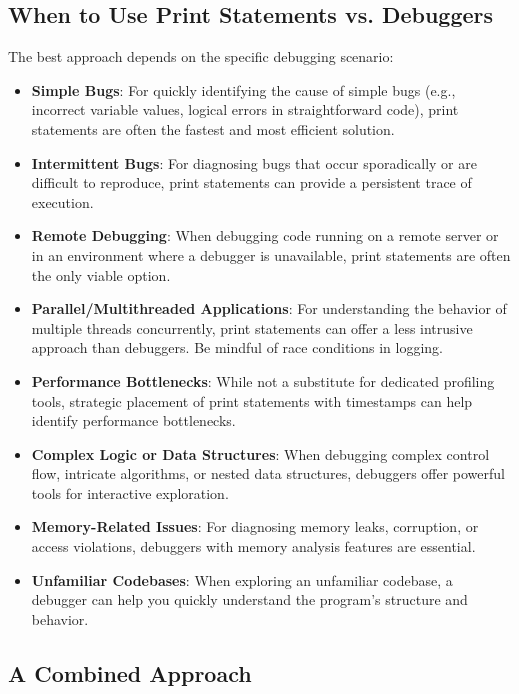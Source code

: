 \documentclass{article}
\begin{document}
\subsection*{When to Use Print Statements vs. Debuggers}

The best approach depends on the specific debugging scenario:

\begin{itemize}
    \item \textbf{Simple Bugs}: For quickly identifying the cause of simple bugs (e.g., incorrect variable values, logical errors in straightforward code), print statements are often the fastest and most efficient solution.
    \item \textbf{Intermittent Bugs}: For diagnosing bugs that occur sporadically or are difficult to reproduce, print statements can provide a persistent trace of execution.
    \item \textbf{Remote Debugging}: When debugging code running on a remote server or in an environment where a debugger is unavailable, print statements are often the only viable option.
    \item \textbf{Parallel/Multithreaded Applications}: For understanding the behavior of multiple threads concurrently, print statements can offer a less intrusive approach than debuggers.  Be mindful of race conditions in logging.
    \item \textbf{Performance Bottlenecks}: While not a substitute for dedicated profiling tools, strategic placement of print statements with timestamps can help identify performance bottlenecks.
    \item \textbf{Complex Logic or Data Structures}: When debugging complex control flow, intricate algorithms, or nested data structures, debuggers offer powerful tools for interactive exploration.
    \item \textbf{Memory-Related Issues}: For diagnosing memory leaks, corruption, or access violations, debuggers with memory analysis features are essential.
    \item \textbf{Unfamiliar Codebases}: When exploring an unfamiliar codebase, a debugger can help you quickly understand the program's structure and behavior.
\end{itemize}

\subsection*{A Combined Approach}
\end{document}
